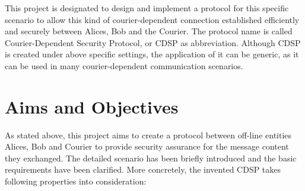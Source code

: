 This project is designated to design and implement a protocol for this specific scenario to allow this kind of courier-dependent connection established efficiently and securely between Alices, Bob and the Courier. The protocol name is called Courier-Dependent Security Protocol, or CDSP as abbreviation. Although CDSP is created under above specific settings, the application of it can be generic, as it can be used in many courier-dependent communication scenarios.

\section{Aims and Objectives}
As stated above, this project aims to create a protocol between off-line entities Alices, Bob and Courier to provide security assurance for the message content they exchanged. The detailed scenario has been briefly introduced and the basic requirements have been clarified. More concretely, the invented CDSP takes following properties into consideration:


